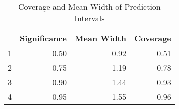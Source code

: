 \begin{table}[ht]
\centering
\begin{tabular}{rrrr}
  \toprule
 & Significance & Mean Width & Coverage \\ 
  \midrule
1 & 0.50 & 0.92 & 0.51 \\ 
  2 & 0.75 & 1.19 & 0.78 \\ 
  3 & 0.90 & 1.44 & 0.93 \\ 
  4 & 0.95 & 1.55 & 0.96 \\ 
   \bottomrule
\end{tabular}
\caption{Coverage and Mean Width of Prediction Intervals} 
\end{table}
